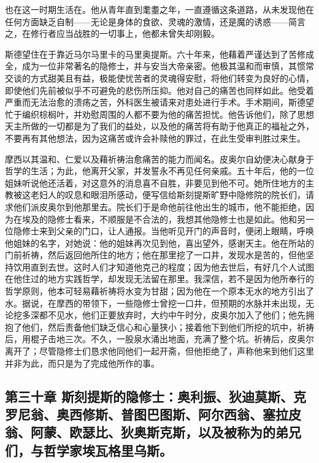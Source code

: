 也在这一时期生活在。他从青年直到耄耋之年，一直遵循这条道路，从未发现他在任何方面缺乏自制——无论是身体的食欲、灵魂的激情，还是魔的诱惑——简言之，在修行者应当战胜的一切事上，他都未曾失却刚毅。\par

斯德望住在于靠近马尔马里卡的马里奥提斯。六十年来，他藉着严谨达到了苦修成全，成为一位非常著名的隐修士，并与安当大帝亲密。他极其温和而审慎，其惯常交谈的方式甜美且有益，极能使忧苦者的灵魂得安慰，将他们转变为良好的心情，即使他们先前被似乎不可避免的悲伤所压抑。他对自己的痛苦也同样如此。他受着严重而无法治愈的溃疡之苦，外科医生被请来对患处进行手术。手术期间，斯德望忙于编织棕榈叶，并劝慰周围的人都不要为他的痛苦担忧。他告诉他们，除了思想天主所做的一切都是为了我们的益处，以及他的痛苦将有助于他真正的福祉之外，不要再有其他想法，因为这痛苦或许会补赎他的罪过，在此生受审判胜过来生。\par

摩西以其温和、仁爱以及藉祈祷治愈痛苦的能力而闻名。皮奥尔自幼便决心献身于哲学的生活；为此，他离开父家，并发誓永不再见任何亲戚。五十年后，他的一位姐妹听说他还活着，对这意外的消息喜不自胜，非要见到他不可。她所住地方的主教被这老妇人的叹息和眼泪所感动，便写信给斯刻提斯旷野中隐修院的院长们，请求他们派皮奥尔到他那里去。院长们于是命他前往他出生的城市，他不能拒绝，因为在埃及的隐修士看来，不顺服是不合法的，我想其他隐修士也是如此。他和另一位隐修士来到父亲的门口，让人通报。当他听见开门的声音时，便闭上眼睛，呼唤他姐妹的名字，对她说：他的姐妹再次见到他，喜出望外，感谢天主。他在所站的门前祈祷，然后返回他所住的地方；他在那里挖了一口井，发现水是苦的，但他坚持饮用直到去世。这时人们才知道他克己的程度；因为他去世后，有好几个人试图在他住过的地方实践哲学，却发现无法留在那里。我深信，若不是因为他所奉行的哲学原则，他本可轻易藉祈祷将水变为甘甜；因为他在一个原本无水的地方引出了水。据说，在摩西的带领下，一些隐修士曾挖一口井，但预期的水脉并未出现，无论挖多深都不见水，他们正要放弃时，大约中午时分，皮奥尔加入了他们；他先拥抱了他们，然后责备他们缺乏信心和心量狭小；接着他下到他们所挖的坑中，祈祷后，用棍子击地三次。不久，一股泉水涌出地面，充满了整个坑。祈祷后，皮奥尔离开了；尽管隐修士们恳求他同他们一起开斋，但他拒绝了，声称他来到他们这里并非为此，而只是为了完成他所作的事。\par


\subsection{第三十章  斯刻提斯的隐修士：奥利振、狄迪莫斯、克罗尼翁、奥西修斯、普图巴图斯、阿尔西翁、塞拉皮翁、阿蒙、欧瑟比、狄奥斯克斯，以及被称为的弟兄们，与哲学家埃瓦格里乌斯。}

